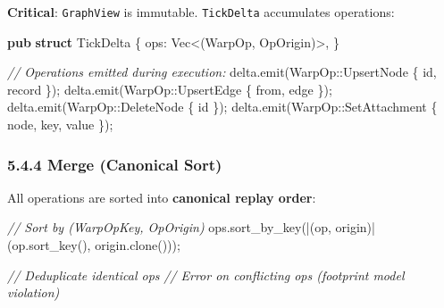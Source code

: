 \documentclass[
]{book}
\newenvironment{Shaded}{}{}
\newcommand{\CommentTok}[1]{\textcolor[rgb]{0.38,0.63,0.69}{\textit{#1}}}
\newcommand{\DataTypeTok}[1]{\textcolor[rgb]{0.56,0.13,0.00}{#1}}
\newcommand{\KeywordTok}[1]{\textcolor[rgb]{0.00,0.44,0.13}{\textbf{#1}}}
\newcommand{\NormalTok}[1]{#1}
\newcommand{\OperatorTok}[1]{\textcolor[rgb]{0.40,0.40,0.40}{#1}}
\newcommand{\PreprocessorTok}[1]{\textcolor[rgb]{0.74,0.48,0.00}{#1}}
\begin{document}
\textbf{Critical}: \texttt{GraphView} is immutable. \texttt{TickDelta}
accumulates operations:

\begin{Shaded}
\begin{Highlighting}[]
\KeywordTok{pub} \KeywordTok{struct}\NormalTok{ TickDelta }\OperatorTok{\{}
\NormalTok{    ops}\OperatorTok{:} \DataTypeTok{Vec}\OperatorTok{\textless{}}\NormalTok{(WarpOp}\OperatorTok{,}\NormalTok{ OpOrigin)}\OperatorTok{\textgreater{},}
\OperatorTok{\}}

\CommentTok{// Operations emitted during execution:}
\NormalTok{delta}\OperatorTok{.}\NormalTok{emit(}\PreprocessorTok{WarpOp::}\NormalTok{UpsertNode }\OperatorTok{\{}\NormalTok{ id}\OperatorTok{,}\NormalTok{ record }\OperatorTok{\}}\NormalTok{)}\OperatorTok{;}
\NormalTok{delta}\OperatorTok{.}\NormalTok{emit(}\PreprocessorTok{WarpOp::}\NormalTok{UpsertEdge }\OperatorTok{\{}\NormalTok{ from}\OperatorTok{,}\NormalTok{ edge }\OperatorTok{\}}\NormalTok{)}\OperatorTok{;}
\NormalTok{delta}\OperatorTok{.}\NormalTok{emit(}\PreprocessorTok{WarpOp::}\NormalTok{DeleteNode }\OperatorTok{\{}\NormalTok{ id }\OperatorTok{\}}\NormalTok{)}\OperatorTok{;}
\NormalTok{delta}\OperatorTok{.}\NormalTok{emit(}\PreprocessorTok{WarpOp::}\NormalTok{SetAttachment }\OperatorTok{\{}\NormalTok{ node}\OperatorTok{,}\NormalTok{ key}\OperatorTok{,}\NormalTok{ value }\OperatorTok{\}}\NormalTok{)}\OperatorTok{;}
\end{Highlighting}
\end{Shaded}

\subsubsection{5.4.4 Merge (Canonical Sort)}\label{merge-canonical-sort}

All operations are sorted into \textbf{canonical replay order}:

\begin{Shaded}
\begin{Highlighting}[]
\CommentTok{// Sort by (WarpOpKey, OpOrigin)}
\NormalTok{ops}\OperatorTok{.}\NormalTok{sort\_by\_key(}\OperatorTok{|}\NormalTok{(op}\OperatorTok{,}\NormalTok{ origin)}\OperatorTok{|}\NormalTok{ (op}\OperatorTok{.}\NormalTok{sort\_key()}\OperatorTok{,}\NormalTok{ origin}\OperatorTok{.}\NormalTok{clone()))}\OperatorTok{;}

\CommentTok{// Deduplicate identical ops}
\CommentTok{// Error on conflicting ops (footprint model violation)}
\end{Highlighting}
\end{Shaded}
\end{document}

